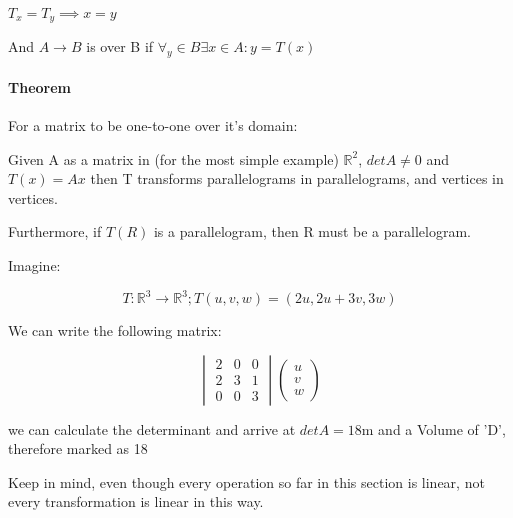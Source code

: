 \documentclass[11pt,fleqn]{book} %
\begin{document}
$T_x = T_y \implies x=y$

And $ A \to B $ is over B if $ \forall_y \in B \exists x \in A : y = T(x) $

\paragraph*{Theorem}
For a matrix to be one-to-one over it's domain:

Given A as a matrix in (for the most simple example) $\mathbb{R}^2$, $det A \neq 0$ and $T(x) = Ax$ then T transforms parallelograms in parallelograms, and
vertices in vertices. 

Furthermore, if $T(R)$ is a parallelogram, then R must be a parallelogram.

\begin{example}
    Imagine: 

\begin{equation}
    T: \mathbb{R}^3 \to \mathbb{R}^3; T(u,v,w) = (2u, 2u+3v, 3w)
\end{equation}

We can write the following matrix:

\begin{equation}
    \begin{vmatrix}
        2 & 0 & 0 \\
        2 & 3 & 1 \\
        0 & 0 & 3
    \end{vmatrix} \begin{pmatrix}
        u \\
        v \\ 
        w 
    \end{pmatrix}
\end{equation}

we can calculate the determinant and arrive at $detA = 18$m and a Volume of 'D', therefore marked as 18 

Keep in mind, even though every operation so far in this section is linear, not every transformation is linear in this way. 

\end{example}
\end{document}
